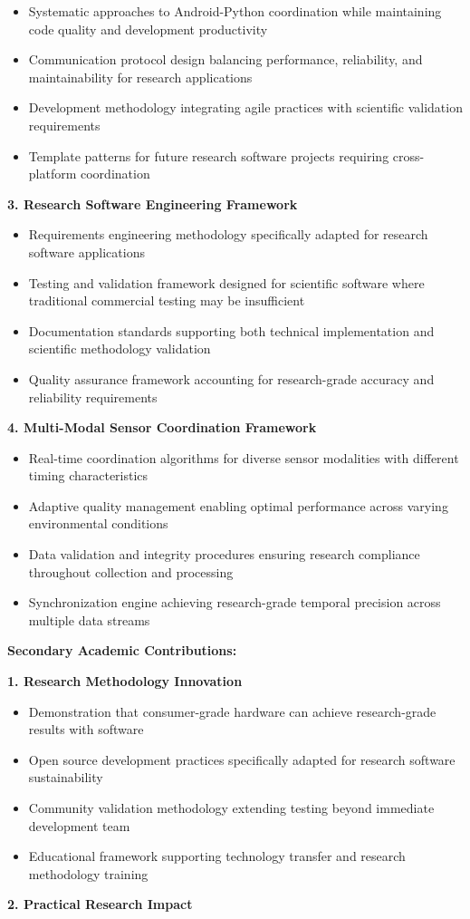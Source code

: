 \documentclass[11pt,a4paper]{article}
\begin{document}
\begin{itemize}
\item Systematic approaches to Android-Python coordination while maintaining code quality and development productivity
\item Communication protocol design balancing performance, reliability, and maintainability for research applications
\item Development methodology integrating agile practices with scientific validation requirements
\item Template patterns for future research software projects requiring cross-platform coordination

\end{itemize}
\textbf{3. Research Software Engineering Framework}

\begin{itemize}
\item Requirements engineering methodology specifically adapted for research software applications
\item Testing and validation framework designed for scientific software where traditional commercial testing may be
  insufficient
\item Documentation standards supporting both technical implementation and scientific methodology validation
\item Quality assurance framework accounting for research-grade accuracy and reliability requirements

\end{itemize}
\textbf{4. Multi-Modal Sensor Coordination Framework}

\begin{itemize}
\item Real-time coordination algorithms for diverse sensor modalities with different timing characteristics
\item Adaptive quality management enabling optimal performance across varying environmental conditions
\item Data validation and integrity procedures ensuring research compliance throughout collection and processing
\item Synchronization engine achieving research-grade temporal precision across multiple data streams

\end{itemize}
\textbf{Secondary Academic Contributions:}

\textbf{1. Research Methodology Innovation}

\begin{itemize}
\item Demonstration that consumer-grade hardware can achieve research-grade results with software
\item Open source development practices specifically adapted for research software sustainability
\item Community validation methodology extending testing beyond immediate development team
\item Educational framework supporting technology transfer and research methodology training

\end{itemize}
\textbf{2. Practical Research Impact}
\end{document}
